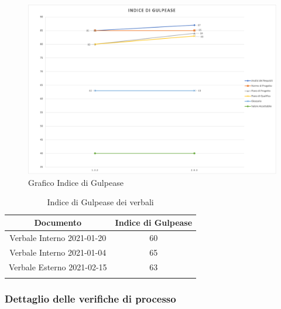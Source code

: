 \begin{center}
    \begin{figure}[!htb]
        \centering
        \includegraphics[scale=0.60]{res/images/RPgulpease.png}
        \caption{Grafico Indice di Gulpease}
    \end{figure}
    \begin{center}
        \begin{longtable}{|c|c|}
            \hline
            \rowcolor{lighter-grayer}
            \textbf{Documento}         & \textbf{Indice di Gulpease} \\
            \hline
            \endfirsthead

            \hline
            Verbale Interno 2021-01-20 & 60                          \\
            Verbale Interno 2021-01-04 & 65                          \\     
            Verbale Esterno 2021-02-15 & 63                          \\           
            \hline
            \rowcolor{white}
            \caption{Indice di Gulpease dei verbali}
        \end{longtable}
    \end{center}
\end{center}




\subsubsection{Dettaglio delle verifiche di processo}

